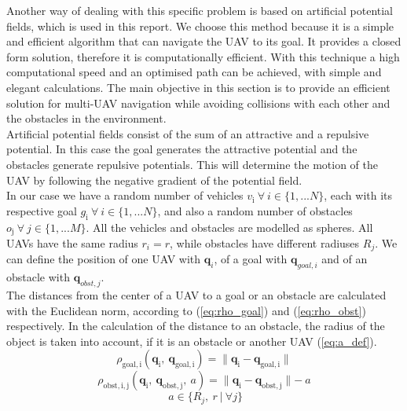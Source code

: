 \documentclass[journal]{IEEEtran}
\newcommand*{\subb}[1]{_{\mathrm{#1}}}
\begin{document}
		Another way of dealing with this specific problem is based on artificial potential fields, which is used in this report. We choose this method because it is a simple and efficient algorithm that can navigate the UAV to its goal. It provides a closed form solution, therefore it is computationally efficient. With this technique a high computational speed and an optimised path can be achieved, with simple and elegant calculations\cite{Ge2002}. The main objective in this section is to provide an efficient solution for multi-UAV navigation while avoiding collisions with each other and the obstacles in the environment.\\
		
		Artificial potential fields consist of the sum of an attractive and a repulsive potential. In this case the goal generates the attractive potential and the obstacles generate repulsive potentials. This will determine the motion of the UAV by following the negative gradient of the potential field. \\
		
		In our case we have a random number of vehicles $v\subb{i} \ \forall \ i \in \{1, ...N\}$, each with its respective goal $g\subb{i} \ \forall \ i \in \{1, ...N\}$, and also a random number of obstacles $o\subb{j} \ \forall \ j \in \{1, ...M\}$. All the vehicles and obstacles are modelled as spheres. All UAVs have the same radius $r_i = r$, while obstacles have different radiuses $R_j$. We can define the position of one UAV with $\bm{q}_i $, of a goal with $\bm{q}_{goal,i}$ and of an obstacle with $\bm{q}_{obst,j} $.\\
		
		The distances from the center of a UAV to a goal or an obstacle are calculated with the Euclidean norm, according to (\ref{eq:rho_goal}) and (\ref{eq:rho_obst}) respectively. In the calculation of the distance to an obstacle, the radius of the object is taken into account, if it is an obstacle or another UAV (\ref{eq:a_def}).
		\begin{equation} \label{eq:rho_goal}
		\rho\subb{goal, i}(\bm{q}\subb{i}, \ \bm{q}\subb{goal, i}) = \parallel \bm{q}\subb{i} - \bm{q}\subb{goal,i}\parallel
		\end{equation}
		\begin{equation} \label{eq:rho_obst}
		\rho\subb{obst, i, j}(\bm{q}\subb{i}, \ \bm{q}\subb{obst, j}, \ a) = \parallel \bm{q}\subb{i} - \bm{q}\subb{obst, j}\parallel - \ a
		\end{equation}
		\begin{equation} \label{eq:a_def}
		\ a \in \{R_j, \ r\ |\ \forall j\}
		\end{equation}
		
\end{document}
